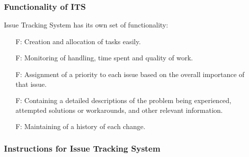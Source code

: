 \documentclass[11pt, oneside]{article}   	%
\newcounter{funcnum} %
\begin{document}
\subsubsection{Functionality of ITS}

Issue Tracking System has its own set of functionality:

\begin{itemize}

\item[F\refstepcounter{funcnum}\thefuncnum \label{f_one}:] Creation and
  allocation of tasks easily.
\item[F\refstepcounter{funcnum}\thefuncnum \label{f_two}:] Monitoring of
  handling, time spent and quality of work.
\item[F\refstepcounter{funcnum}\thefuncnum \label{f_three}:]Assignment of a
  priority to each issue based on the overall importance of that issue.
\item[F\refstepcounter{funcnum}\thefuncnum \label{f_four}:]Containing a detailed
  descriptions of the problem being experienced, attempted solutions or
  workarounds, and other relevant information.
\item[F\refstepcounter{funcnum}\thefuncnum \label{f_five}:]Maintaining of a
  history of each change.

 \end{itemize}

\clearpage

\subsubsection{Instructions for Issue Tracking System}
\end{document}
